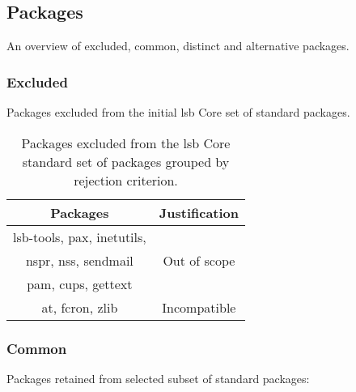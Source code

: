 \subsection{Packages}\label{Packages}

An overview of excluded, common, distinct and alternative packages.

\subsubsection{Excluded}

Packages excluded from the initial \gls{lsb} Core set of standard packages.

\begin{table}[!h]
    \centering
    \begin{tabular}{|c|c|}
        \hline
        Packages & Justification \\
        \hline
        \hline
        lsb-tools\cite{lsb-tools}, pax\cite{pax}, inetutils\cite{inetutils}, & \multirow{3}{*}{Out of scope} \\
        nspr\cite{nspr}, nss\cite{nss}, sendmail\cite{sendmail} & \\
        pam\cite{linux-pam}, cups\cite{cups}, gettext\cite{gettext} & \\
        \hline
        at\cite{at}\footnotemark[1], fcron\cite{fcron}\footnotemark[1], zlib\cite{zlib}\footnotemark[2] & Incompatible \\
        \hline
    \end{tabular}
    \caption{Packages excluded from the \gls{lsb} Core standard set of packages grouped by rejection criterion.}
\end{table}


\subsubsection{Common}

Packages retained from selected subset of standard packages:


